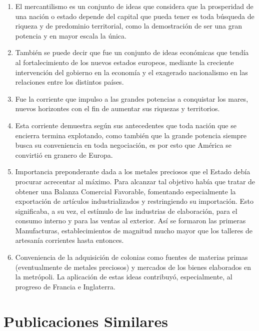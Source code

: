\documentclass[
  stu,
  floatsintext,
  longtable,
  a4paper,
  nolmodern,
  notxfonts,
  notimes,
  12pt,
  colorlinks=true,linkcolor=blue,citecolor=blue,urlcolor=blue]{apa7}
\begin{document}
\begin{enumerate}
\def\labelenumi{\arabic{enumi}.}
\item
  \hspace{0pt} El mercantilismo es un conjunto de ideas que considera
  que la prosperidad de una nación o estado depende del capital que
  pueda tener es toda búsqueda de riqueza y de predominio territorial,
  como la demostración de ser una gran potencia y en mayor escala la
  única.
\item
  \hspace{0pt} También se puede decir que fue un conjunto de ideas
  económicas que tendía al fortalecimiento de los nuevos estados
  europeos, mediante la creciente intervención del gobierno en la
  economía y el exagerado nacionalismo en las relaciones entre los
  distintos países.
\item
  \hspace{0pt} Fue la corriente que impulso a las grandes potencias a
  conquistar los mares, nuevos horizontes con el fin de aumentar sus
  riquezas y territorios.
\item
  \hspace{0pt} Esta corriente demuestra según sus antecedentes que toda
  nación que se encierra termina explotando, como también que la grande
  potencia siempre busca su conveniencia en toda negociación, es por
  esto que América se convirtió en granero de Europa.
\item
  Importancia preponderante dada a los metales preciosos que el Estado
  debía procurar acrecentar al máximo. Para alcanzar tal objetivo había
  que tratar de obtener una Balanza Comercial Favorable, fomentando
  especialmente la exportación de artículos industrializados y
  restringiendo su importación. Esto significaba, a su vez, el estímulo
  de las industrias de elaboración, para el consumo interno y para las
  ventas al exterior. Así se formaron las primeras Manufacturas,
  establecimientos de magnitud mucho mayor que los talleres de artesanía
  corrientes hasta entonces.
\item
  \hspace{0pt} Conveniencia de la adquisición de colonias como fuentes
  de materias primas (eventualmente de metales preciosos) y mercados de
  los bienes elaborados en la metrópoli. La aplicación de estas ideas
  contribuyó, especialmente, al progreso de Francia e Inglaterra.
\end{enumerate}

\section{Publicaciones Similares}\label{publicaciones-similares}
\end{document}
